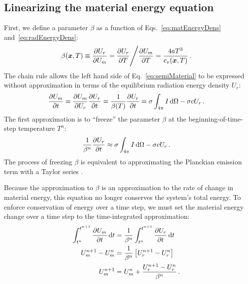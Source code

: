 \subsection{Linearizing the material energy equation}

First, we define a parameter $\beta$ as a function of
Eqs.~\eqref{eq:matEnergyDens} and~\eqref{eq:radEnergyDens}:
\begin{equation} \label{eq:beta}
  \beta(\bm{x}, T) \equiv \frac{\partial U_r}{\partial U_m} 
  = \frac{\partial U_r}{\partial T} \Bigg/ \frac{\partial U_m}{\partial T}
  = \frac{4 a T^3}{c_v(\bm{x}, T)} \,.
\end{equation}
The chain rule allows the left hand side of Eq.~\eqref{eq:semiMaterial} to be
expressed without approximation in terms of the equilibrium radiation energy
density $U_r$:
\begin{equation*}
  \frac{\partial U_m}{\partial t} = \frac{\partial U_m}{\partial U_r} \frac{\partial U_r}{\partial t} = \frac{1}{\beta(T)}
  \frac{\partial U_r}{\partial t} = \sigma \int_{4\pi}  I \mathop{}\!\mathrm{d} \Omega - \sigma c U_r \,.
\end{equation*}
The first approximation is to ``freeze'' the parameter $\beta$ at the beginning-of-time-step temperature $T^n$:
\begin{equation}\label{eq:frozenBeta}
  \frac{1}{\beta^n}
  \frac{\partial U_r}{\partial t} \approx \sigma \int_{4\pi}  I \mathop{}\!\mathrm{d} \Omega - \sigma c U_r \,.
\end{equation}
The process of freezing $\beta$ is equivalent to approximating the
Planckian emission term with a Taylor series \cite{Kno2007}.

Because the approximation to $\beta$ is an approximation to the rate of change
in material energy, this equation no longer conserves the system's total
energy. To enforce conservation of energy over a time step, we must set the
material energy change over a time step to the time-integrated approximation:
\begin{align}
  \nonumber
  \int_{t^n}^{t^{n+1}}  \frac{\partial U_m}{\partial t}\mathop{}\!\mathrm{d} t &= \frac{1}{\beta^n}
  \int_{t^n}^{t^{n+1}} \frac{\partial U_r}{\partial t}\mathop{}\!\mathrm{d} t
  \\
  \nonumber
  U_m^{n+1} - U_m^n &= \frac{1}{\beta^n} \left[ U_r^{n+1} - U_r^n \right]
  \\
  \label{eq:matenConservationUpdate}
  U_m^{n+1} &=  U_m^n + \frac{U_r^{n+1} - U_r^n}{\beta^n}\,.
\end{align}

